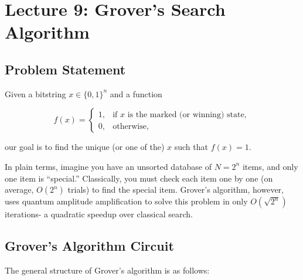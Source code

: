 \section{Lecture 9: Grover's Search Algorithm}\label{sec:lecture9}

\subsection*{Problem Statement}

Given a bitstring \( x \in \{0, 1\}^n \) and a function

\[
  f(x) =
  \begin{cases}
    1, & \text{if } x \text{ is the marked (or winning) state}, \\
    0, & \text{otherwise},
  \end{cases}
\]

our goal is to find the unique (or one of the) \( x \) such that \( f(x)=1 \).

\vspace{0.3cm}

In plain terms, imagine you have an unsorted database of \( N = 2^n \) items,
and only one item is “special.” Classically, you must check each item one by
one (on average, \( O(2^n) \) trials) to find the special item. Grover's
algorithm, however, uses quantum amplitude amplification to solve this
problem in only \( O(\sqrt{2^n}) \) iterations- a quadratic speedup over
classical search.


\subsection*{Grover's Algorithm Circuit}

The general structure of Grover's algorithm is as follows:

